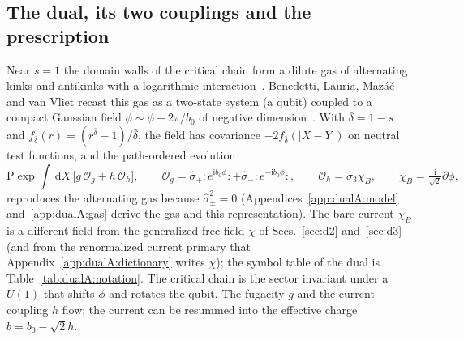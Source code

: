 \documentclass[11pt,a4paper]{article}
\numberwithin{equation}{section}
\newcommand{\dd}{\,\mathrm d}
\newcommand{\db}{\bar\delta}
\newcommand{\Og}{\mathcal O_g}
\newcommand{\Oh}{\mathcal O_h}
\begin{document}
\subsection{The dual, its two couplings and the prescription}\label{sec:dual}
Near $s=1$ the domain walls of the critical chain form a dilute gas of alternating kinks and antikinks with a
logarithmic interaction~\cite{Anderson:1970kyb,Kosterlitz:1976zz}. Benedetti, Lauria, Maz\'a\v c and van Vliet recast
this gas as a two-state system (a qubit) coupled to a compact Gaussian field $\phi\sim\phi+2\pi/b_0$ of negative
dimension~\cite{Benedetti:2024wgx,Benedetti:2025nzp}. With $\db=1-s$ and $f_{\db}(r)=(r^{\db}-1)/\db$, the field has
covariance $-2f_{\db}(|X-Y|)$ on neutral test functions, and the path-ordered evolution
\begin{equation}
 \mathrm P\exp\int\dd X\,\bigl[g\,\Og+h\,\Oh\bigr],\qquad
 \Og=\hat\sigma_+{:}e^{\mathrm i b_0\phi}{:}+\hat\sigma_-{:}e^{-\mathrm i b_0\phi}{:},\qquad
 \Oh=\hat\sigma_3\chi_B,\qquad \chi_B=\tfrac{\mathrm i}{\sqrt2}\partial\phi,
 \label{eq:dual}
\end{equation}
reproduces the alternating gas because $\hat\sigma_\pm^2=0$ (Appendices~\ref{app:dualA:model}
and~\ref{app:dualA:gas} derive the gas and this representation). The bare current $\chi_B$ is a different field from the generalized free
field $\chi$ of Secs.~\ref{sec:d2} and~\ref{sec:d3} (and from the renormalized current primary that
Appendix~\ref{app:dualA:dictionary} writes $\chi$); the symbol table of the dual is Table~\ref{tab:dualA:notation}. The critical chain is the sector invariant under a $U(1)$
that shifts $\phi$ and rotates the qubit. The fugacity $g$ and the current coupling $h$ flow; the current can be
resummed into the effective charge $b=b_0-\sqrt2h$.
\end{document}
